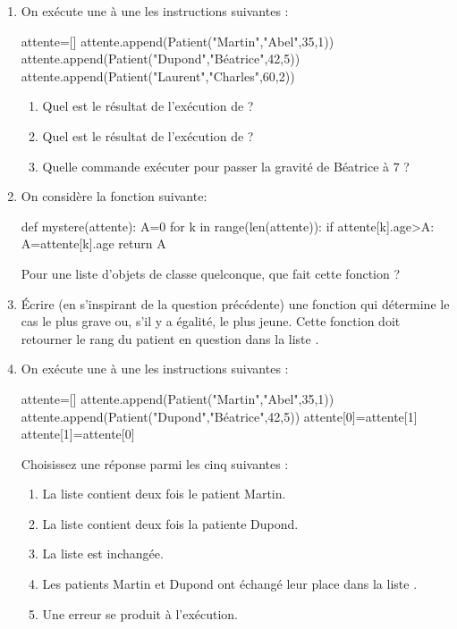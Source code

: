 \documentclass[11pt,a4paper,french,twoside]{VcCours}
\begin{document}
\begin{enumerate}
    \item On exécute une à une les instructions suivantes :
\begin{Python}
attente=[]
attente.append(Patient("Martin","Abel",35,1))
attente.append(Patient("Dupond","Béatrice",42,5))
attente.append(Patient("Laurent","Charles",60,2))
\end{Python}
\begin{enumerate}
    \item Quel est le résultat de l'exécution de  ?
    \item Quel est le résultat de l'exécution de  ?
    \item Quelle commande exécuter pour passer la gravité de Béatrice à $7$ ?
\end{enumerate}    
    \item On considère la fonction suivante:
\begin{Python}
def mystere(attente):
    A=0
    for k in range(len(attente)):
        if attente[k].age>A:
            A=attente[k].age
    return A
\end{Python}
    Pour une liste  d'objets de classe  quelconque,
    que fait cette fonction ?
    \item Écrire (en s'inspirant de la question précédente) une fonction  qui détermine
    le cas le plus grave ou, s'il y a égalité, le plus jeune.
    Cette fonction doit retourner le rang du patient en question dans la liste 
    .
    \item On exécute une à une les instructions suivantes :
\begin{Python}
attente=[]
attente.append(Patient("Martin","Abel",35,1))
attente.append(Patient("Dupond","Béatrice",42,5))
attente[0]=attente[1]
attente[1]=attente[0]
\end{Python}
    Choisissez une réponse parmi les cinq suivantes :
    \begin{enumerate}
        \item La liste  contient deux fois le patient Martin. 
        \item La liste  contient deux fois la patiente Dupond. 
        \item La liste  est inchangée. 
        \item Les patients Martin et Dupond ont échangé leur place dans la liste . 
        \item Une erreur se produit à l'exécution. 

\end{enumerate}
\end{enumerate}
\end{document}
